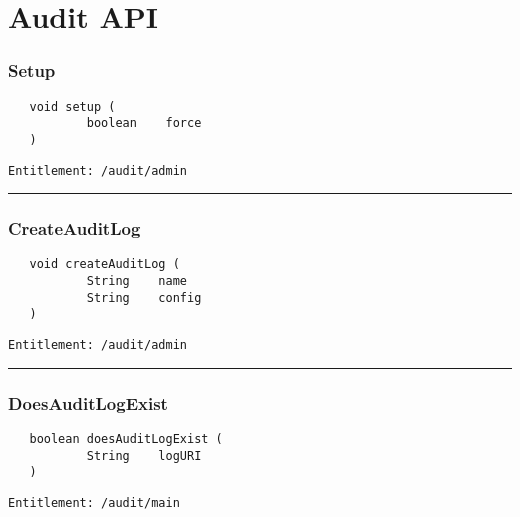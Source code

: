 \chapter{Audit API}

\subsection{Setup}
\label{Api:Setup}
\begin{verbatim}
   void setup (
           boolean    force
   )
\end{verbatim}
\begin{Verbatim}[fontsize=\small, formatcom=\color{Maroon}]
  Entitlement: /audit/admin
\end{Verbatim}



\rule{12cm}{2pt}
\subsection{CreateAuditLog}
\label{Api:CreateAuditLog}
\begin{verbatim}
   void createAuditLog (
           String    name
           String    config
   )
\end{verbatim}
\begin{Verbatim}[fontsize=\small, formatcom=\color{Maroon}]
  Entitlement: /audit/admin
\end{Verbatim}



\rule{12cm}{2pt}
\subsection{DoesAuditLogExist}
\label{Api:DoesAuditLogExist}
\begin{verbatim}
   boolean doesAuditLogExist (
           String    logURI
   )
\end{verbatim}
\begin{Verbatim}[fontsize=\small, formatcom=\color{Maroon}]
  Entitlement: /audit/main
\end{Verbatim}



